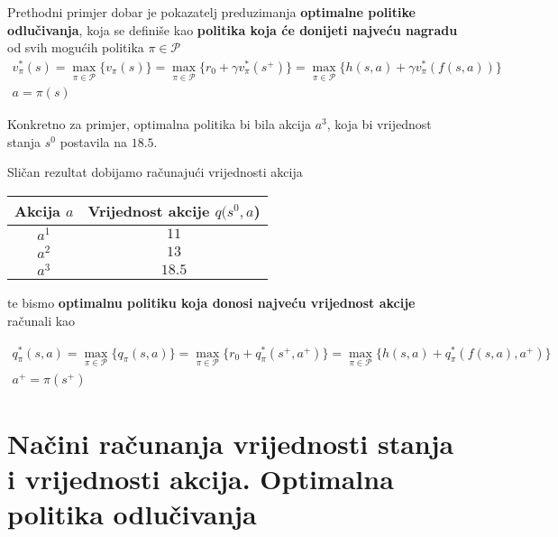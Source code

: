 \documentclass[12pt]{IEEEtran}
\numberwithin{equation}{subsection}
\numberwithin{figure}{subsection}
\theoremstyle{definition}
\numberwithin{example}{section}
\begin{document}
Prethodni primjer dobar je pokazatelj preduzimanja \textbf{optimalne politike odlu\v{c}ivanja}, koja se defini\v{s}e 
kao \textbf{politika koja \'{c}e donijeti najve\'{c}u nagradu} od svih mogu\'{c}ih politika $\pi \in \mathcal{P}$
\begin{gather}
    v^{*}_{\pi}(s) = \max_{\pi \in \mathcal{P}}\{v_{\pi}(s)\} = \max_{\pi \in \mathcal{P}}\{r_{0} + \gamma v^{*}_{\pi}(s^{+})\} = \max_{\pi \in \mathcal{P}}\{h(s, a) + \gamma v^{*}_{\pi}(f(s, a))\}\\
    a = \pi(s)
\end{gather}

Konkretno za primjer, optimalna politika bi bila akcija $a^{3}$, koja bi
vrijednost stanja $s^{0}$ postavila na $18.5$.

Sli\v{c}an rezultat dobijamo ra\v{c}unaju\'{c}i vrijednosti akcija

\begin{table}[h]
    \normalsize
    \centering
    \begin{tabular}{*2c}
        \textbf{Akcija $a$} & \textbf{Vrijednost akcije $q(s^{0}, a$)} \\
        \toprule
        $a^{1}$             & $11$                                     \\
        \hline
        $a^{2}$             & $13$                                     \\
        \hline
        $a^{3}$             & $18.5$                                   \\
        \hline
    \end{tabular}
\end{table}

te bismo \textbf{optimalnu politiku koja donosi najve\'{c}u vrijednost akcije} ra\v{c}unali kao

\begin{gather}
    q^{*}_{\pi}(s, a) = \max_{\pi \in \mathcal{P}}\{q_{\pi}(s, a)\} = \max_{\pi \in \mathcal{P}}\{r_{0} + q^{*}_{\pi}(s^{+}, a^{+})\} = \max_{\pi \in \mathcal{P}}\{h(s, a) + q^{*}_{\pi}(f(s, a), a^{+})\}\\
    a^{+} = \pi(s^{+})
\end{gather}

\newpage
\section{\textbf{Na\v{c}ini ra\v{c}unanja vrijednosti stanja i vrijednosti akcija. Optimalna politika odlu\v{c}ivanja}}
\end{document}
